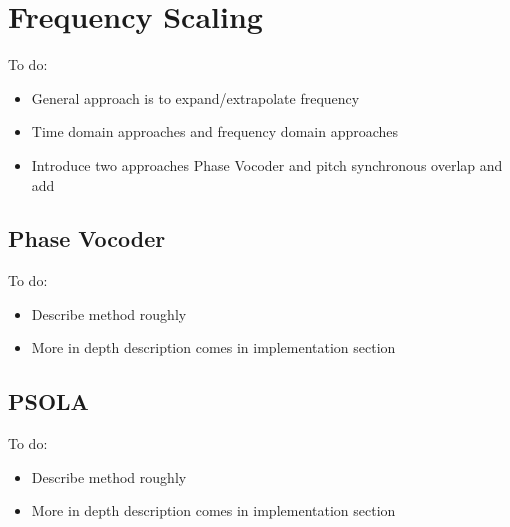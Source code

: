 \section{Frequency Scaling}

\color{red}
To do:
\begin{itemize}
	\item General approach is to expand/extrapolate frequency
	\item Time domain approaches and frequency domain approaches
	\item Introduce two approaches Phase Vocoder and pitch synchronous overlap and add
\end{itemize}
\color{black}

\subsection{Phase Vocoder}

\color{red}
To do:
\begin{itemize}
	\item Describe method roughly
	\item More in depth description comes in implementation section
\end{itemize}
\color{black}

\subsection{PSOLA}

\color{red}
To do:
\begin{itemize}
	\item Describe method roughly
	\item More in depth description comes in implementation section
\end{itemize}
\color{black}
